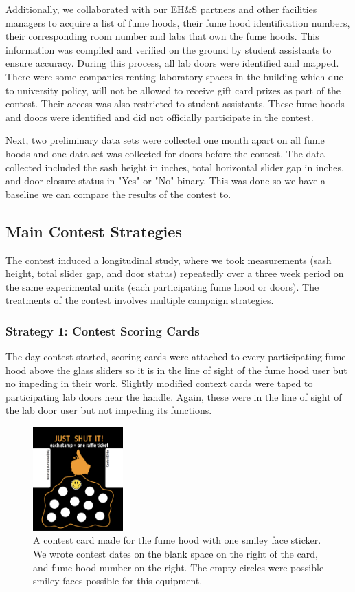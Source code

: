 \documentclass[12pt, twocolumn]{article}
\begin{document}
Additionally, we collaborated with our EH\&S partners and other facilities managers to acquire a list of fume hoods, their fume hood identification numbers, their corresponding room number and labs that own the fume hoods. This information was compiled and verified on the ground by student assistants to ensure accuracy. During this process, all lab doors were identified and mapped. There were some companies renting laboratory spaces in the building which due to university policy, will not be allowed to receive gift card prizes as part of the contest. Their access was also restricted to student assistants.  These fume hoods and doors were identified and did not officially participate in the contest. 

Next, two preliminary data sets were collected one month apart on all fume hoods and one data set was collected for doors before the contest.  The data collected included the sash height in inches, total horizontal slider gap in inches, and door closure status in "Yes" or "No" binary. This was done so we have a baseline we can compare the results of the contest to. 

\subsection*{Main Contest Strategies}\label{Sec:ContestStrategies}
The contest induced a longitudinal study, where we took measurements (sash height, total slider gap, and door status) repeatedly over a three week period on the same experimental units (each participating fume hood or doors). The treatments of the contest involves multiple campaign strategies.

\subsubsection*{Strategy 1: Contest Scoring Cards}\label{Sec:Strategy1}
The day contest started, scoring cards were attached to every participating fume hood above the glass sliders so it is in the line of sight of the fume hood user but no impeding in their work. Slightly modified context cards were taped to participating lab doors near the handle. Again, these were in the line of sight of the lab door user but not impeding its functions. 

\begin{figure}[ht]	
	\centering
	\includegraphics[width=0.31\textwidth]{Images/Contest_JustShutIt.png}
	\caption{A contest card made for the fume hood with one smiley face sticker. We wrote contest dates on the blank space on the right of the card, and fume hood number on the right. The empty circles were possible smiley faces possible for this equipment. }
	\label{Fig:JustShutIt}
\end{figure}
\end{document}
